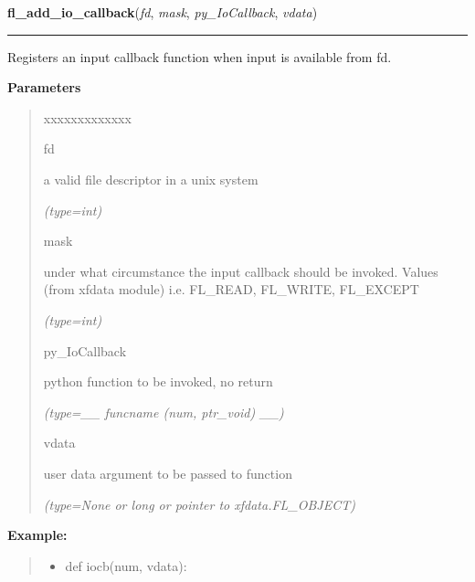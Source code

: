 \hspace{.8\funcindent}\begin{boxedminipage}{\funcwidth}

    \raggedright \textbf{fl\_add\_io\_callback}(\textit{fd}, \textit{mask}, \textit{py\_IoCallback}, \textit{vdata})

    \vspace{-1.5ex}

    \rule{\textwidth}{0.5\fboxrule}
\setlength{\parskip}{2ex}
    Registers an input callback function when input is available from fd.

\setlength{\parskip}{1ex}
      \textbf{Parameters}
      \vspace{-1ex}

      \begin{quote}
        \begin{Ventry}{xxxxxxxxxxxxx}

          \item[fd]

          a valid file descriptor in a unix system

            {\it (type=int)}

          \item[mask]

          under what circumstance the input callback should be invoked. 
          Values (from xfdata module) i.e. FL\_READ, FL\_WRITE, FL\_EXCEPT

            {\it (type=int)}

          \item[py\_IoCallback]

          python function to be invoked, no return

            {\it (type=\_\_ funcname (num, ptr\_void) \_\_)}

          \item[vdata]

          user data argument to be passed to function

            {\it (type=None or long or pointer to xfdata.FL\_OBJECT)}

        \end{Ventry}

      \end{quote}

\textbf{Example:}
\begin{quote}
  \begin{itemize}

  \item
    \setlength{\parskip}{0.6ex}
def iocb(num, vdata):




\end{itemize}
\end{quote}
\end{boxedminipage}
